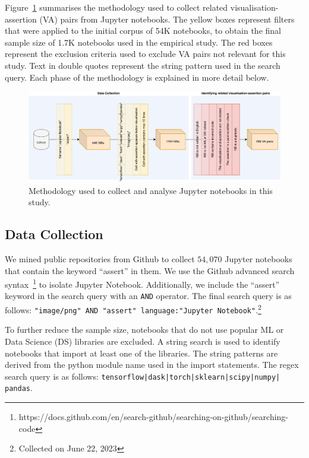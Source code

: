 \documentclass[conference]{IEEEtran}
\begin{document}
Figure~\ref{fig:method} summarises the methodology used to collect related visualisation-assertion (VA) pairs from Jupyter notebooks. The yellow boxes represent filters that were applied to the initial corpus of 54K notebooks, to obtain the final sample size of 1.7K notebooks used in the empirical study. The red boxes represent the exclusion criteria used to exclude VA pairs not relevant for this study. Text in double quotes represent the string pattern used in the search query. Each phase of the methodology is explained in more detail below.

\begin{figure}
  \centering
  \includegraphics[width=\textwidth]{method.pdf}
  \caption{Methodology used to collect and analyse Jupyter notebooks
    in this study.}
  \label{fig:method}
\end{figure}

\subsection{Data Collection}\label{sec:data-collect}

We mined public repositories from Github to collect $54,070$ Jupyter notebooks that contain the keyword ``assert'' in them. We use the Github advanced search syntax~\footnote{https://docs.github.com/en/search-github/searching-on-github/searching-code} to isolate Jupyter Notebook. Additionally, we include the ``assert'' keyword in the search query with an \texttt{AND} operator. The final search query is as follows: \texttt{"image/png" AND "assert" language:"Jupyter Notebook"}.\footnote{Collected on June 22, 2023}

To further reduce the sample size, notebooks that do not use popular ML or Data Science (DS) libraries are excluded. A string search is used to identify notebooks that import at least one of the libraries. The string patterns are derived from the python module name used in the import statements. The regex search query is as follows: \texttt{tensorflow|dask|torch|sklearn|scipy|numpy| pandas}.
\end{document}
